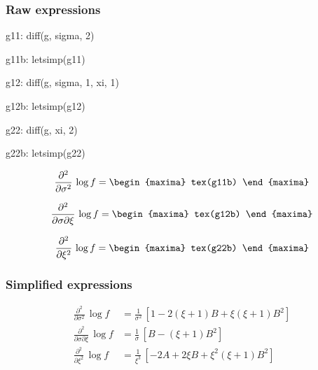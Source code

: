 \subsubsection*{Raw expressions} 
 
 \begin{maxima}
   g11: diff(g, sigma, 2)
 \end{maxima}%
 \begin{maxima}
   g11b: letsimp(g11)
 \end{maxima}%
 
 \begin{maxima}
   g12: diff(g, sigma, 1, xi, 1)
 \end{maxima}%
 
 \begin{maxima}
   g12b: letsimp(g12)
 \end{maxima}%
 
 \begin{maxima}
   g22: diff(g, xi, 2)
 \end{maxima}%
 
 \begin{maxima}
   g22b: letsimp(g22)
 \end{maxima}%
 
{\color{MonVertF}  
$$
\frac{\partial^2}{\partial \sigma^2} \,\log f = 
\begin{maxima}
  tex(g11b)
\end{maxima}
$$

$$
\frac{\partial^2}{\partial \sigma \partial \xi} \, \log f =
\begin{maxima}
  tex(g12b)
\end{maxima}
$$

$$
 \frac{\partial^2}{\partial \xi^2}\, \log f =
\begin{maxima}
 tex(g22b)
\end{maxima}
$$
}

\subsubsection*{Simplified  expressions}

{\color{red}
\begin{align*}
  \frac{\partial^2}{\partial \sigma^2} \,\log f
  &= \frac{1}{\sigma^2}\, \left[ 1 - 2 (\xi + 1) B + \xi (\xi + 1) B^2\right] \\
 \frac{\partial^2}{\partial \sigma \partial \xi} \,\log f 
  &= \frac{1}{\sigma}\, \left[ B - (\xi + 1) B^2\right] \\
    \frac{\partial^2}{\partial \xi^2} \,\log f 
  &= \frac{1}{\xi^3}\, \left[-2 A + 2 \xi  B + \xi^2 (\xi + 1) B^2\right]
\end{align*}
}



